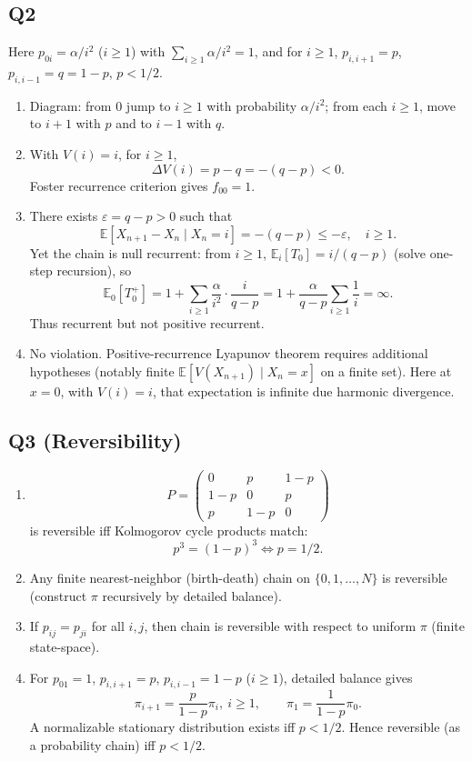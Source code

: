 \documentclass[11pt]{article}
\newcommand{\EE}{\mathbb{E}}
\newcommand{\1}{\mathbf{1}}
\begin{document}
\subsection*{Q2}
Here $p_{0i}=\alpha/i^2$ ($i\ge1$) with $\sum_{i\ge1}\alpha/i^2=1$, and for $i\ge1$, $p_{i,i+1}=p$, $p_{i,i-1}=q=1-p$, $p<1/2$.
\begin{enumerate}[label=(\alph*)]
\item Diagram: from $0$ jump to $i\ge1$ with probability $\alpha/i^2$; from each $i\ge1$, move to $i+1$ with $p$ and to $i-1$ with $q$.
\item With $V(i)=i$, for $i\ge1$,
\[
\Delta V(i)=p-q=-(q-p)<0.
\]
Foster recurrence criterion gives $f_{00}=1$.
\item There exists $\varepsilon=q-p>0$ such that
\[
\EE[X_{n+1}-X_n\mid X_n=i]=-(q-p)\le-\varepsilon,\quad i\ge1.
\]
Yet the chain is null recurrent: from $i\ge1$, $\EE_i[T_0]=i/(q-p)$ (solve one-step recursion), so
\[
\EE_0[T_0^+]=1+\sum_{i\ge1}\frac{\alpha}{i^2}\cdot\frac{i}{q-p}
=1+\frac{\alpha}{q-p}\sum_{i\ge1}\frac1i=\infty.
\]
Thus recurrent but not positive recurrent.
\item No violation. Positive-recurrence Lyapunov theorem requires additional hypotheses (notably finite $\EE[V(X_{n+1})\mid X_n=x]$ on a finite set). Here at $x=0$, with $V(i)=i$, that expectation is infinite due harmonic divergence.
\end{enumerate}

\subsection*{Q3 (Reversibility)}
\begin{enumerate}[label=(\alph*)]
\item
\[
P=\begin{pmatrix}
0&p&1-p\\
1-p&0&p\\
p&1-p&0
\end{pmatrix}
\]
is reversible iff Kolmogorov cycle products match:
\[
p^3=(1-p)^3 \iff p=1/2.
\]
\item Any finite nearest-neighbor (birth-death) chain on $\{0,1,\dots,N\}$ is reversible (construct $\pi$ recursively by detailed balance).
\item If $p_{ij}=p_{ji}$ for all $i,j$, then chain is reversible with respect to uniform $\pi$ (finite state-space).
\item For $p_{01}=1$, $p_{i,i+1}=p$, $p_{i,i-1}=1-p$ ($i\ge1$), detailed balance gives
\[
\pi_{i+1}=\frac{p}{1-p}\pi_i,\ i\ge1,\qquad \pi_1=\frac{1}{1-p}\pi_0.
\]
A normalizable stationary distribution exists iff $p<1/2$. Hence reversible (as a probability chain) iff $p<1/2$.
\end{enumerate}
\end{document}
